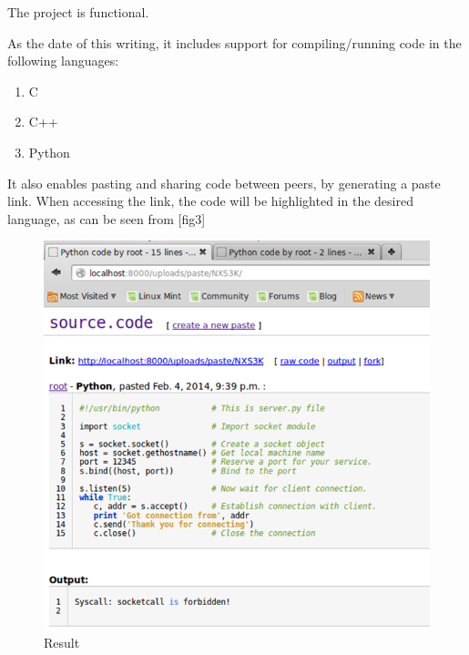 
The project is functional.

As the date of this writing, it includes support for compiling/running code in the following languages:
\begin{enumerate}
\item{C}
\item{C++}
\item{Python}
\end{enumerate}

It also enables pasting and sharing code between peers, by generating a paste link.
When accessing the link, the code will be highlighted in the desired language, as can be seen from [fig3]

\begin{figure}
\begin{center}
\includegraphics[scale=0.5]{pics/result.png}
\caption{Result}
\end{center}
\label{fig3:result}
\end{figure}
